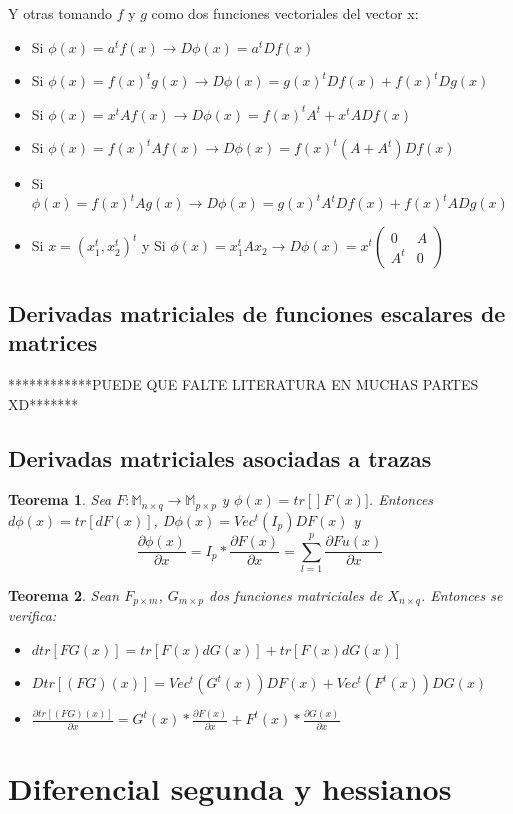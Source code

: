 \documentclass{article}
\theoremstyle{theorem-style}  %
\newtheorem{theorem}{Teorema}[section]  %
\theoremstyle{definition}
\theoremstyle{example-style}
\begin{document}
Y otras tomando $f$ y $g$ como dos funciones vectoriales del vector x:

\begin{itemize}
	\item Si $\phi(x) = a^tf(x) \rightarrow D\phi(x) = a^tDf(x)$
	\item  Si $\phi(x) = f(x)^tg(x) \rightarrow D\phi(x) = g(x)^tDf(x)+ f(x)^tDg(x)$
	\item Si $\phi(x) = x^tAf(x) \rightarrow D\phi(x) = f(x)^t A^t + x^tADf(x)$
	\item Si $\phi(x) = f(x)^tAf(x) \rightarrow D\phi(x) = f(x)^t(A+A^t)Df(x)$
	\item Si $\phi(x) = f(x)^tAg(x) \rightarrow D\phi(x) = g(x)^tA^tDf(x)+ f(x)^tADg(x)$
	\item Si $x=(x_1^t,x_2^t)^t$ y Si $\phi(x) = x_1^tAx_2 \rightarrow D\phi(x) = x^t (\begin{array}{cc}
	0 & A\\
	A^t  & 0
	\end{array})$ 
\end{itemize}
	
\subsection{Derivadas matriciales de funciones escalares de matrices}


************PUEDE QUE FALTE LITERATURA EN MUCHAS PARTES XD*******

\subsection*{Derivadas matriciales asociadas a trazas}

\begin{theorem}
	Sea $F:\mathbb{M}_{n\times q}\rightarrow \mathbb{M}_{p\times p}$ y $\phi (x) = tr[]F(x)]$. Entonces $d\phi(x)= tr[dF(x)]$, $D\phi(x)= Vec^t(I_p)DF(x)$ y 
	$$ \frac{\partial \phi(x)}{\partial x} = I_p* \frac{\partial F(x)}{\partial x} = \sum_{l=1}^{p} \frac{\partial Fu(x)}{\partial x} $$ 
\end{theorem}

\begin{theorem}
	Sean $F_{p\times m}$, $G_{m\times p}$ dos funciones matriciales de $X_{n\times q}$. Entonces se verifica:
	\begin{itemize}
		\item $dtr[FG(x)] = tr[F(x)dG(x)]+ tr[F(x)dG(x)]$
		\item $Dtr[(FG)(x)] = Vec^t(G^t(x))DF(x) + Vec^t(F^t(x))DG(x)$
		\item $ \frac{\partial tr[(FG)(x)]}{\partial x} = G^t(x) * \frac{\partial F(x)}{\partial x} + F^t(x) * \frac{\partial G(x)}{\partial x}$
	\end{itemize}
\end{theorem}



\section{Diferencial segunda y hessianos}


	
\end{document}
